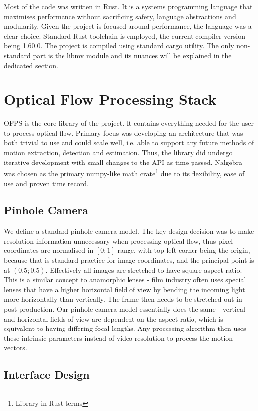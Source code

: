 \documentclass[11pt,english]{report}
\begin{document}
Most of the code was written in Rust. It is a systems programming language that maximises performance without sacrificing safety, language abstractions and modularity. Given the project is focused around performance, the language was a clear choice. Standard Rust toolchain is employed, the current compiler version being 1.60.0. The project is compiled using standard cargo utility. The only non-standard part is the libmv module and its nuances will be explained in the dedicated section.

\section{Optical Flow Processing Stack}

OFPS is the core library of the project. It contains everything needed for the user to process optical flow. Primary focus was developing an architecture that was both trivial to use and could scale well, i.e. able to support any future methods of motion extraction, detection and estimation. Thus, the library did undergo iterative development with small changes to the API as time passed. Nalgebra was chosen as the primary numpy-like math crate\footnote{Library in Rust terms} due to its flexibility, ease of use and proven time record.

\subsection{Pinhole Camera}

We define a standard pinhole camera model. The key design decision was to make resolution information unnecessary when processing optical flow, thus pixel coordinates are normalised in $[0; 1]$ range, with top left corner being the origin, because that is standard practice for image coordinates, and the principal point is at $(0.5; 0.5)$. Effectively all images are stretched to have square aspect ratio. This is a similar concept to anamorphic lenses - film industry often uses special lenses that have a higher horizontal field of view by bending the incoming light more horizontally than vertically. The frame then needs to be stretched out in post-production. Our pinhole camera model essentially does the same - vertical and horizontal fields of view are dependent on the aspect ratio, which is equivalent to having differing focal lengths. Any processing algorithm then uses these intrinsic parameters instead of video resolution to process the motion vectors.

\subsection{Interface Design}
\end{document}

